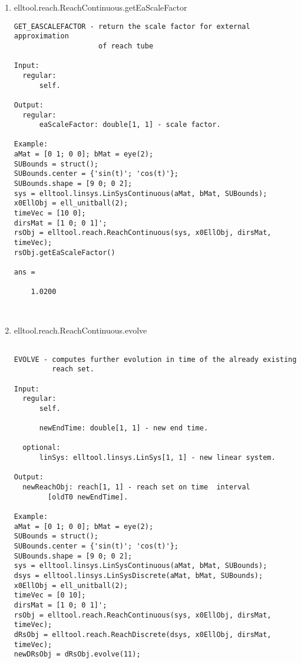 \begin{enumerate}
\begin{lstlisting}
\end{lstlisting}
\fontfamily{\familydefault}
\selectfont
\item {elltool.reach.ReachContinuous.getEaScaleFactor}
\selectfont
\begin{lstlisting}
GET_EASCALEFACTOR - return the scale factor for external approximation
                    of reach tube

Input:
  regular:
      self.

Output:
  regular:
      eaScaleFactor: double[1, 1] - scale factor.

Example:
aMat = [0 1; 0 0]; bMat = eye(2);
SUBounds = struct();
SUBounds.center = {'sin(t)'; 'cos(t)'};
SUBounds.shape = [9 0; 0 2];
sys = elltool.linsys.LinSysContinuous(aMat, bMat, SUBounds);
x0EllObj = ell_unitball(2);
timeVec = [10 0];
dirsMat = [1 0; 0 1]';
rsObj = elltool.reach.ReachContinuous(sys, x0EllObj, dirsMat, timeVec);
rsObj.getEaScaleFactor()

ans =

    1.0200



\end{lstlisting}
\fontfamily{\familydefault}
\selectfont
\item {elltool.reach.ReachContinuous.evolve}
\selectfont
\begin{lstlisting}

EVOLVE - computes further evolution in time of the already existing
         reach set.

Input:
  regular:
      self.

      newEndTime: double[1, 1] - new end time.

  optional:
      linSys: elltool.linsys.LinSys[1, 1] - new linear system.

Output:
  newReachObj: reach[1, 1] - reach set on time  interval
        [oldT0 newEndTime].

Example:
aMat = [0 1; 0 0]; bMat = eye(2);
SUBounds = struct();
SUBounds.center = {'sin(t)'; 'cos(t)'};
SUBounds.shape = [9 0; 0 2];
sys = elltool.linsys.LinSysContinuous(aMat, bMat, SUBounds);
dsys = elltool.linsys.LinSysDiscrete(aMat, bMat, SUBounds);
x0EllObj = ell_unitball(2);
timeVec = [0 10];
dirsMat = [1 0; 0 1]';
rsObj = elltool.reach.ReachContinuous(sys, x0EllObj, dirsMat, timeVec);
dRsObj = elltool.reach.ReachDiscrete(dsys, x0EllObj, dirsMat, timeVec);
newDRsObj = dRsObj.evolve(11);






\end{lstlisting}
\end{enumerate}

